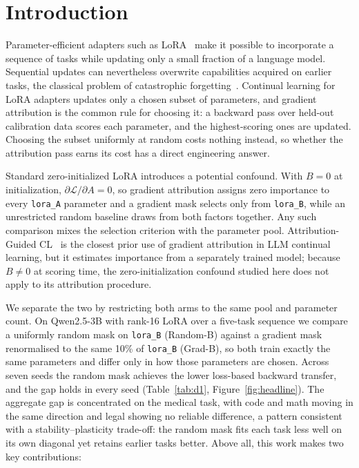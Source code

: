 \section{Introduction}
\label{sec:intro}

Parameter-efficient adapters such as LoRA~\citep{hu2021lora, dettmers2023qlora} make it possible to incorporate a sequence of tasks while updating only a small fraction of a language model. Sequential updates can nevertheless overwrite capabilities acquired on earlier tasks, the classical problem of catastrophic forgetting~\citep{mccloskey1989catastrophic, french1999catastrophic}.
Continual learning for LoRA adapters updates only a chosen subset of parameters, and gradient attribution is the common rule for choosing it: a backward pass over held-out calibration data scores each parameter, and the highest-scoring ones are updated. Choosing the subset uniformly at random costs nothing instead, so whether the attribution pass earns its cost has a direct engineering answer.

Standard zero-initialized LoRA introduces a potential confound. With $B = 0$ at initialization, $\partial \mathcal{L}/\partial A = 0$, so gradient attribution assigns zero importance to every \texttt{lora\_A} parameter and a gradient mask selects only from \texttt{lora\_B}, while an unrestricted random baseline draws from both factors together. Any such comparison mixes the selection criterion with the parameter pool. Attribution-Guided CL~\citep{liu2026attributionguided} is the closest prior use of gradient attribution in LLM continual learning, but it estimates importance from a separately trained model; because $B\neq0$ at scoring time, the zero-initialization confound studied here does not apply to its attribution procedure.

We separate the two by restricting both arms to the same pool and parameter count. On Qwen2.5-3B with rank-16 LoRA over a five-task sequence we compare a uniformly random mask on \texttt{lora\_B} (Random-B) against a gradient mask renormalised to the same 10\% of \texttt{lora\_B} (Grad-B), so both train exactly the same parameters and differ only in how those parameters are chosen. Across seven seeds the random mask achieves the lower loss-based backward transfer, and the gap holds in every seed (Table~\ref{tab:d1}, Figure~\ref{fig:headline}). The aggregate gap is concentrated on the medical task, with code and math moving in the same direction and legal showing no reliable difference, a pattern consistent with a stability--plasticity trade-off: the random mask fits each task less well on its own diagonal yet retains earlier tasks better. Above all, this work makes two key contributions:

